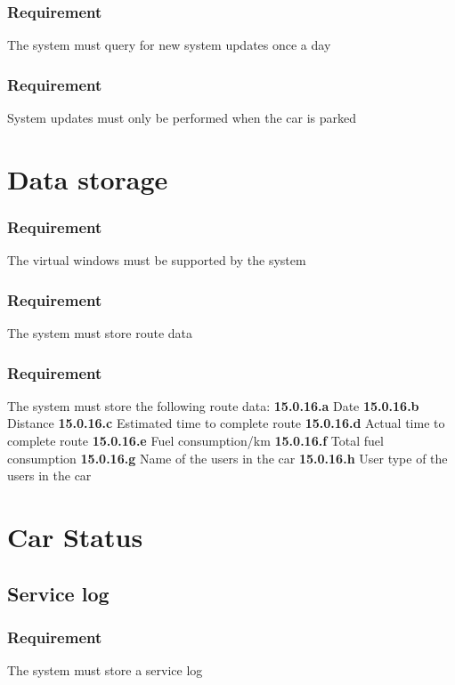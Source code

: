 \documentclass{article}
\begin{document}
{    \subsubsection{Requirement}
\hfill \break 
\- \- \-The system must query for new system updates once a day
    \subsubsection{Requirement}
\hfill \break 
\- \- \-System updates must only be performed when the car is parked

\section{Data storage}
    \subsubsection{Requirement}
\hfill \break 
\- \- \-The virtual windows must be supported by the system
    \subsubsection{Requirement}
\hfill \break 
\- \- \-The system must store route data
    \subsubsection{Requirement}
\hfill \break 
\- \- \-The system must store the following route data:
\hfill \break 
\indent
\textbf{15.0.16.a} Date
\hfill \break 
\indent
\textbf{15.0.16.b} Distance
\hfill \break 
\indent
\textbf{15.0.16.c} Estimated time to complete route
\hfill \break 
\indent
\textbf{15.0.16.d} Actual time to complete route
\hfill \break 
\indent
\textbf{15.0.16.e} Fuel consumption/km
\hfill \break 
\indent
\textbf{15.0.16.f} Total fuel consumption
\hfill \break 
\indent
\textbf{15.0.16.g} Name of the users in the car
\hfill \break 
\indent
\textbf{15.0.16.h} User type of the users in the car



\section{Car Status}
  \subsection{Service log}
      \subsubsection{Requirement}
\hfill \break 
\- \- \-The system must store a service log
}
\end{document}
